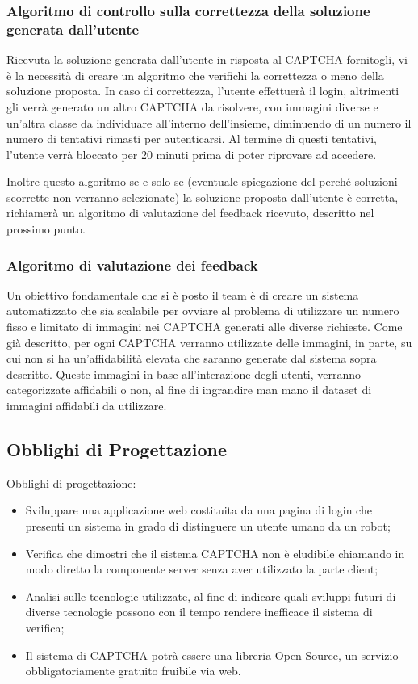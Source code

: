 \subsubsection{Algoritmo di controllo sulla correttezza della soluzione generata dall'utente}
Ricevuta la soluzione generata dall'utente in risposta al CAPTCHA fornitogli, vi è la necessità di creare un algoritmo che verifichi la correttezza o meno della soluzione proposta. In caso di correttezza, l'utente effettuerà il login, altrimenti gli verrà generato un altro CAPTCHA da risolvere, con immagini diverse e un'altra classe da individuare all'interno dell'insieme, diminuendo di un numero il numero di tentativi rimasti per autenticarsi. Al termine di questi tentativi, l'utente verrà bloccato per 20 minuti prima di poter riprovare ad accedere. 

Inoltre questo algoritmo se e solo se (eventuale spiegazione del perché soluzioni scorrette non verranno selezionate) la soluzione proposta dall'utente è corretta, richiamerà un algoritmo di valutazione del feedback ricevuto, descritto nel prossimo punto.

\subsubsection{Algoritmo di valutazione dei feedback}
Un obiettivo fondamentale che si è posto il team è di creare un sistema automatizzato che sia scalabile per ovviare al problema di utilizzare un numero fisso e limitato di immagini nei CAPTCHA generati alle diverse richieste. Come già descritto, per ogni CAPTCHA verranno utilizzate delle immagini, in parte, su cui non si ha un'affidabilità elevata che saranno generate dal sistema sopra descritto. Queste immagini in base all'interazione degli utenti, verranno categorizzate affidabili o non, al fine di ingrandire man mano il dataset di immagini affidabili da utilizzare.

\subsection{Obblighi di Progettazione}
Obblighi di progettazione:
\begin{itemize}
    \item Sviluppare una applicazione web costituita da una pagina di login che presenti un sistema in grado di distinguere un utente umano da un robot;
    \item Verifica che dimostri che il sistema CAPTCHA non è eludibile chiamando in modo diretto la componente server senza aver utilizzato la parte client;
    \item Analisi sulle tecnologie utilizzate, al fine di indicare quali sviluppi futuri di diverse tecnologie possono con il tempo rendere inefficace il sistema di verifica;
    \item Il sistema di CAPTCHA potrà essere una libreria Open Source, un servizio obbligatoriamente gratuito fruibile via web.
\end{itemize}

